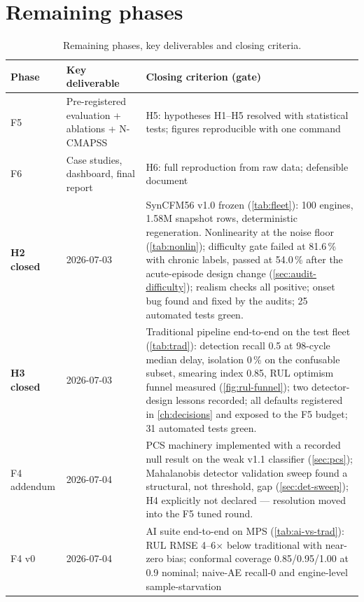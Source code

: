 \section{Remaining phases}

\begin{table}[htbp]
  \centering\small
  \caption{Remaining phases, key deliverables and closing criteria.}
  \label{tab:remaining-phases}
  \begin{tabular}{p{}p{}p{}}
    \toprule
    Phase & Key deliverable & Closing criterion (gate) \\
    \midrule
    F5 & Pre-registered evaluation + ablations + N-CMAPSS &
         H5: hypotheses H1--H5 resolved with statistical tests; figures reproducible with one
         command \\
    F6 & Case studies, dashboard, final report &
         H6: full reproduction from raw data; defensible document \\
    \textbf{H2 closed} & 2026-07-03 & SynCFM56 v1.0 frozen (\cref{tab:fleet}): 100 engines,
      1.58M snapshot rows, deterministic regeneration. Nonlinearity at the noise floor
      (\cref{tab:nonlin}); difficulty gate failed at 81.6\,\% with chronic labels, passed at
      54.0\,\% after the acute-episode design change (\cref{sec:audit-difficulty}); realism
      checks all positive; onset bug found and fixed by the audits; 25 automated tests green. \\
    \textbf{H3 closed} & 2026-07-03 & Traditional pipeline end-to-end on the test fleet
      (\cref{tab:trad}): detection recall 0.5 at 98-cycle median delay, isolation 0\,\% on
      the confusable subset, smearing index 0.85, RUL optimism funnel measured
      (\cref{fig:rul-funnel}); two detector-design lessons recorded; all defaults registered
      in \cref{ch:decisions} and exposed to the F5 budget; 31 automated tests green. \\
    F4 addendum & 2026-07-04 & PCS machinery implemented with a
      recorded null result on the weak v1.1 classifier (\cref{sec:pcs}); Mahalanobis
      detector validation sweep found a structural, not threshold, gap
      (\cref{sec:det-sweep}); H4 explicitly not declared --- resolution moved into the F5
      tuned round. \\
    F4 v0 & 2026-07-04 & AI suite end-to-end on MPS (\cref{tab:ai-vs-trad}): RUL RMSE
      4--6$\times$ below traditional with near-zero bias; conformal coverage
      0.85/0.95/1.00 at 0.9 nominal; naive-AE recall-0 and engine-level sample-starvation

\end{tabular}
\end{table}
